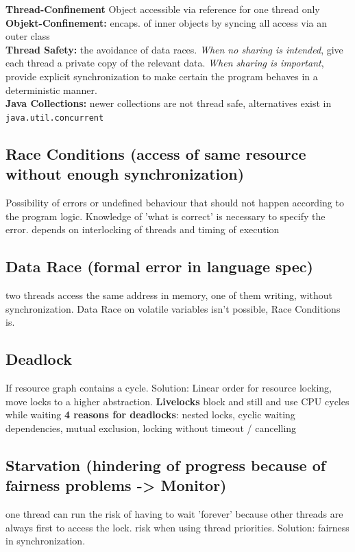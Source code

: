 \textbf{Thread-Confinement} Object accessible via reference for one thread only \\
\textbf{Objekt-Confinement:} encaps. of inner objects by syncing all access via an outer class \\
\textbf{Thread Safety:} the avoidance of data races. \textit{When no sharing is intended}, give each thread a private copy of the relevant data.
\textit{When sharing is important}, provide explicit synchronization to make certain the program behaves in a deterministic manner.\\
\textbf{Java Collections:} newer collections are not thread safe, alternatives exist in \texttt{java.util.concurrent}

\subsection{Race Conditions (access of same resource without enough synchronization)}
Possibility of errors or undefined behaviour that should not happen according to the program logic. Knowledge of 'what is correct' is necessary to specify the error.
depends on interlocking of threads and timing of execution
\subsection{Data Race (formal error in language spec)}
two threads access the same address in memory, one of them writing, without synchronization. Data Race on volatile variables isn't possible, Race Conditions is. 

\subsection{Deadlock}
If resource graph contains a cycle. Solution: Linear order for resource locking, move locks to a higher abstraction. 
\textbf{Livelocks} block and still and use CPU cycles while waiting
\textbf{4 reasons for deadlocks}: nested locks, cyclic waiting dependencies, mutual exclusion, locking without timeout / cancelling

\subsection{Starvation (hindering of progress because of fairness problems -> Monitor)}
one thread can run the risk of having to wait 'forever' because other threads are always first to access the lock. risk when using thread priorities. Solution: fairness in synchronization.

